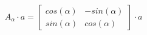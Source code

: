 \documentclass[preview]{standalone}
\begin{document}
\begin{align*}
A_{\alpha} \cdot a = \begin{bmatrix} cos(\alpha) & -sin(\alpha) \\ sin(\alpha) & cos(\alpha)\end{bmatrix} \cdot a
\end{align*}
\end{document}
